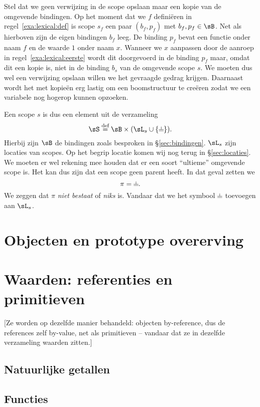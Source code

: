 Stel dat we geen verwijzing in de scope opslaan maar een kopie van de omgevende bindingen. Op het moment dat we $f$ definiëren in regel~\ref{exa:lexical:def} is scope $s_f$ een paar $(b_f,p_f)$ met $b_f,p_f\in\sB$. Net als hierboven zijn de eigen bindingen $b_f$ leeg. De binding $p_f$ bevat een functie onder naam $f$ en de waarde $1$ onder naam $x$. Wanneer we $x$ aanpassen door de aanroep in regel~\ref{exa:lexical:eerste} wordt dit doorgevoerd in de binding $p_f$ maar, omdat dit een kopie is, niet in de binding $b_s$ van de omgevende scope $s$. We moeten dus wel een verwijzing opslaan willen we het gevraagde gedrag krijgen. Daarnaast wordt het met kopieën erg lastig om een boomstructuur te creëren zodat we een variabele nog hogerop kunnen opzoeken.

Een scope $s$ is dus een element uit de verzameling
\begin{equation*}
  \sS \DEF \sB \times (\sL_s \cup \{\BOT\}).
\end{equation*}
Hierbij zijn $\sB$ de bindingen zoals besproken in §\ref{sec:bindingen}. $\sL_s$ zijn locaties van scopes. Op het begrip locatie komen wij nog terug in §\ref{sec:locaties}. We moeten er wel rekening mee houden dat er een soort \enquote{ultieme} omgevende scope is. Het kan dus zijn dat een scope geen parent heeft. In dat geval zetten we
\begin{equation*}
  \pi = \nil.
\end{equation*}
We zeggen dat $\pi$ \emph{niet bestaat} of \emph{niks} is. Vandaar dat we het symbool $\nil$ toevoegen aan $\sL_s$.

\section{Objecten en prototype overerving}

\section{Waarden: referenties en primitieven}

[Ze worden op dezelfde manier behandeld: objecten by-reference, dus de references zelf by-value, net als primitieven -- vandaar dat ze in dezelfde verzameling waarden zitten.]

\subsection{Natuurlijke getallen}

\subsection{Functies}

